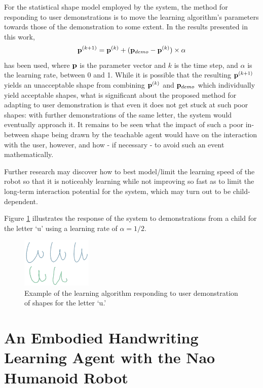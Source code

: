 \documentclass{sig-alternate}
\begin{document}
For the statistical shape model employed by the system, the method for
responding to user demonstrations is to move the learning algorithm's parameters
towards those of the demonstration to some extent. In the results presented in
this work, \[{\bf p}^{(k+1)} = {\bf p}^{(k)} + ({\bf p}_{demo}-{\bf
p}^{(k)})\times\alpha\] has been used, where ${\bf p}$ is the parameter vector
and $k$ is the time step, and $\alpha$ is the learning rate, between 0 and 1.
While it is possible that the resulting ${\bf p}^{(k+1)}$ yields an unacceptable
shape from combining ${\bf p}^{(k)}$ and ${\bf p}_{demo}$ which individually
yield acceptable shapes, what is significant about the proposed method for
adapting to user demonstration is that even it does not get stuck at such poor
shapes: with further demonstrations of the same letter, the system would
eventually approach it. It remains to be seen what the impact of such a poor
in-between shape being drawn by the teachable agent would have on the
interaction with the user, however, and how - if necessary - to avoid such an
event mathematically.

Further research may discover how to best model/limit the learning speed of the
robot so that it is noticeably learning while not improving so fast as to limit
the long-term interaction potential for the system, which may turn out to be
child-dependent.

Figure \ref{fig:demonstrationShapes2} illustrates the response of the system to
demonstrations from a child for the letter `u' using a learning rate of
$\alpha=1/2$. 

\begin{figure}[thpb]
    \centering
    \includegraphics[width=0.3\textwidth]{figures/u_kids.png}
    \caption{\label{fig:demonstrationShapes2}Example of the learning algorithm
    responding to user demonstration of shapes for the letter `u.'}
\end{figure}





\section{An Embodied Handwriting Learning Agent with the Nao Humanoid Robot} \label{sec:robotWriting}
\end{document}

